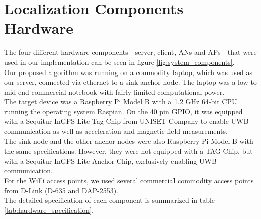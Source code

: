 \section{Localization Components Hardware}
The four different hardware components - server, client, ANs and APs - that were used in our implementation can be seen in figure \ref{fig:system_components}.\\
\noindent\hspace*{5mm}%
Our proposed algorithm was running on a commodity laptop, which was used as our server, connected via ethernet to a sink anchor node. The laptop was a low to mid-end commercial notebook with fairly limited computational power.\\
\noindent\hspace*{5mm}%
The target device was a Raspberry Pi Model B \cite{Raspberry} with a 1.2 GHz 64-bit CPU running the operating system Raspian. On the 40 pin GPIO, it was equipped with a Sequitur InGPS Lite Tag Chip from UNISET Company to enable UWB communication as well as acceleration and magnetic field measurements.\\
\noindent\hspace*{5mm}%
The sink node and the other anchor nodes were also Raspberry Pi Model B with the same specifications. However, they were not equipped with a TAG Chip, but with a Sequitur InGPS Lite Anchor Chip, exclusively enabling UWB communication.\\
\noindent\hspace*{5mm}%
For the WiFi access points, we used several commercial commodity access points from D-Link (D-635 and DAP-2553).\\
\noindent\hspace*{5mm}%
The detailed specification of each component is summarized in table \ref{tab:hardware_specification}.
